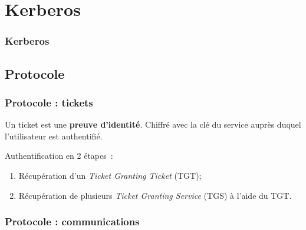 \documentclass[svgnames]{beamer}
\begin{document}

\section{Kerberos}

\begin{frame}
  \frametitle{Kerberos}
  
  
\end{frame}

\subsection{Protocole}

\begin{frame}
 \frametitle{Protocole : tickets}
 
  \begin{definition}
   Un ticket est une \textbf{preuve d'identité}.
   Chiffré avec la clé du service auprès duquel 
   l'utilisateur est authentifié. %
  \end{definition}
  
  \pause

  \vfill
  
  Authentification en 2 étapes~:
  \begin{enumerate}
   \item Récupération d'un \textit{Ticket Granting Ticket} (TGT); %
   \item Récupération de plusieurs \textit{Ticket Granting Service} (TGS) à l'aide du TGT. %
  \end{enumerate}
  
\end{frame}

\begin{frame}
 \frametitle{Protocole : communications}
\end{frame}
\end{document}
